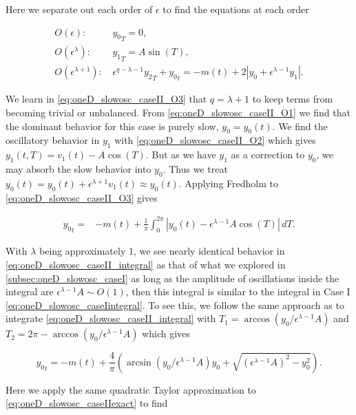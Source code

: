 Here we separate out each order of $\epsilon$ to find the equations at each order

\begin{align} \label{eq:oneD_slowosc_caseII_O1}
O(\epsilon):\, &{y_0}_T=0,\\ \label{eq:oneD_slowosc_caseII_O2}
O(\epsilon^\lambda): \, & {y_1}_T = A\sin(T),\\ \label{eq:oneD_slowosc_caseII_O3}
O(\epsilon^{\lambda+1}):\, & \epsilon^{q-\lambda-1}{y_2}_T+ {y_0}_t = -m(t) +2|y_0+\epsilon^{\lambda-1}y_1|.
\end{align}

We learn in \eqref{eq:oneD_slowosc_caseII_O3} that $q=\lambda+1$ to keep terms from becoming trivial or unbalanced. From \eqref{eq:oneD_slowosc_caseII_O1} we find that the dominant behavior for this case is purely slow, $y_0=y_0(t)$. We find the oscillatory behavior in $y_1$ with \eqref{eq:oneD_slowosc_caseII_O2} which gives $y_1(t,T)=v_1(t)-A\cos(T)$. But as we have $y_1$ as a correction to $y_0$, we may absorb the slow behavior into $y_0$. Thus we treat $y_0(t)=y_0(t)+\epsilon^{\lambda+1} v_1(t)\approx y_0(t)$. Applying Fredholm to \eqref{eq:oneD_slowosc_caseII_O3} gives 

\begin{equation}\label{eq:oneD_slowosc_caseII_integral}
\begin{aligned}
{y_0}_t=& -m(t)+\frac{1}{\pi}\int_0^{2\pi}|y_0(t)-\epsilon^{\lambda-1}A\cos(T)|\,dT.
\end{aligned}
\end{equation}

With $\lambda$ being approximately 1, we see nearly identical behavior in \eqref{eq:oneD_slowosc_caseII_integral} as that of what we explored in \autoref{subsec:oneD_slowosc_caseI} as long as the amplitude of oscillations inside the integral are $\epsilon^{\lambda-1}A\sim O(1)$, then this integral is similar to the integral in Case I \eqref{eq:oneD_slowosc_caseIintegral}. To see this, we follow the same approach as to integrate \eqref{eq:oneD_slowosc_caseII_integral} with $T_1=\arccos(y_0/\epsilon^{\lambda-1}A)$ and $T_2=2\pi- \arccos(y_0/\epsilon^{\lambda-1}A)$ which gives

\begin{equation}\label{eq:oneD_slowosc_caseIIexact}
{y_0}_t=-m(t)+\frac{4}{\pi}\left(\arcsin(y_0/\epsilon^{\lambda-1}A)y_0+\sqrt{(\epsilon^{\lambda-1}A)^2-y_0^2}\right).
\end{equation}

Here we apply the same quadratic Taylor approximation to \eqref{eq:oneD_slowosc_caseIIexact} to find

